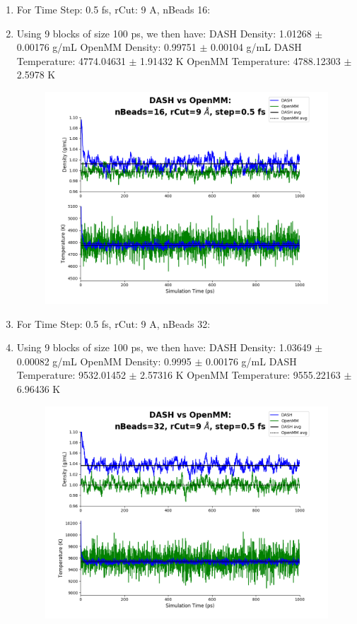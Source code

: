 \documentclass[12pt,reqno]{amsart}
\numberwithin{equation}{section}
\begin{document}
\begin{enumerate}
\begin{figure}[H]
\end{figure}
\item For Time Step: 0.5 fs, rCut: 9 A, nBeads 16:
\item Using 9 blocks of size 100 ps, we then have:
\subitem DASH Density: 1.01268 $\pm$ 0.00176 g/mL
\subitem OpenMM Density: 0.99751 $\pm$ 0.00104 g/mL
\subitem DASH Temperature: 4774.04631 $\pm$ 1.91432 K
\subitem OpenMM Temperature: 4788.12303 $\pm$ 2.5978 K
\begin{figure}[H]
\centering
\includegraphics[scale=0.7]{MC-MM-nBead16-rCut9-ts05}
\end{figure}

\item For Time Step: 0.5 fs, rCut: 9 A, nBeads 32:
\item Using 9 blocks of size 100 ps, we then have:
\subitem DASH Density: 1.03649 $\pm$ 0.00082 g/mL
\subitem OpenMM Density: 0.9995 $\pm$ 0.00176 g/mL
\subitem DASH Temperature: 9532.01452 $\pm$ 2.57316 K
\subitem OpenMM Temperature: 9555.22163 $\pm$ 6.96436 K
\begin{figure}[H]
\centering
\includegraphics[scale=0.7]{MC-MM-nBead32-rCut9-ts05}
\end{figure}


\end{enumerate}
\end{document}
